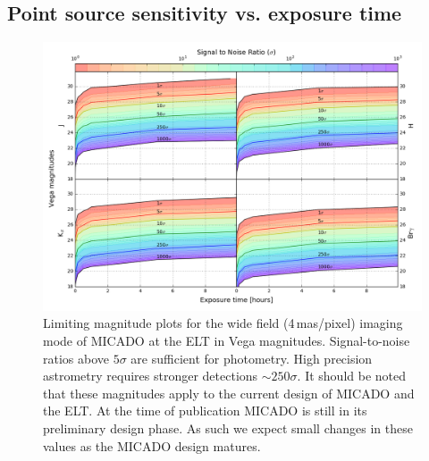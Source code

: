 \subsection{Point source sensitivity vs. exposure time}

\begin{figure}

    \centering
    \includegraphics[width=\textwidth]{images/MICADO_SNR_Rainbow_JHKBrG_vega}

    \caption{Limiting magnitude plots for the wide field (4\,mas/pixel) imaging mode of MICADO at the ELT in Vega magnitudes. Signal-to-noise ratios above $5\sigma$ are sufficient for photometry. High precision astrometry requires stronger detections $\sim 250\sigma$. It should be noted that these magnitudes apply to the current design of MICADO and the ELT. At the time of publication MICADO is still in its preliminary design phase. As such we expect small changes in these values as the MICADO design matures.}
    
    \label{fig:point_source_sensitivities}
    
\end{figure}






